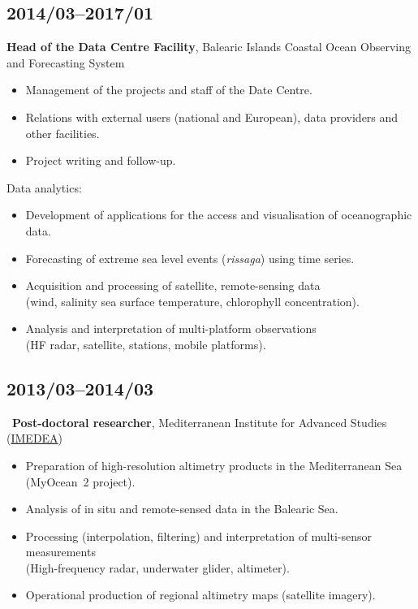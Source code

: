 \documentclass[11pt,a4paper,sans,svgnames]{moderncv}
\begin{document}
\subsection{2014/03--2017/01}

\textbf{Head of the Data Centre Facility}, Balearic Islands Coastal Ocean Observing and Forecasting System%
\begin{itemize}%
\item Management of the projects and staff of the Date Centre.
\item Relations with external users (national and European), data providers and other facilities.
\item Project writing and follow-up.
\end{itemize}
Data analytics:
\begin{itemize}%
\item Development of applications for the access and visualisation of oceanographic data.
\item Forecasting of extreme sea level events (\textit{rissaga}) using time series.
\item Acquisition and processing of satellite, remote-sensing data\\(wind, salinity sea surface temperature, chlorophyll concentration).
\item Analysis and interpretation of multi-platform observations\\(HF radar, satellite, stations, mobile platforms).
\end{itemize}


\subsection{2013/03--2014/03}

~\textbf{Post-doctoral researcher}, Mediterranean Institute for Advanced Studies (\href{http://imedea.uib-csic.es/}{IMEDEA})

\begin{itemize}%
\item Preparation of high-resolution altimetry products in the Mediterranean Sea (MyOcean~2 project).
\item Analysis of in situ and remote-sensed data in the Balearic Sea.
\item Processing (interpolation, filtering) and interpretation of multi-sensor measurements\\(High-frequency radar, underwater glider, altimeter).
\item Operational production of regional altimetry maps (satellite imagery).
\end{itemize}
\end{document}
